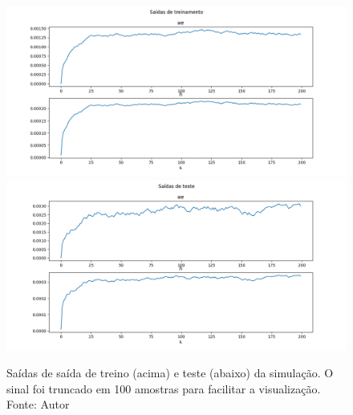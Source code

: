 \begin{figure}[hbt!]
    \centering
    \includegraphics[width=0.8\linewidth]{Imagens/chap04/simulation_outputs_train_raw.png}
    \hfill
    \includegraphics[width=0.8\linewidth]{Imagens/chap04/simulation_outputs_test_raw.png}
    \caption{Saídas de saída de treino (acima) e teste (abaixo) da simulação. O sinal foi truncado em 100 amostras para facilitar a visualização. Fonte: Autor}
    \label{fig:sim_outputs_raw}
\end{figure}

